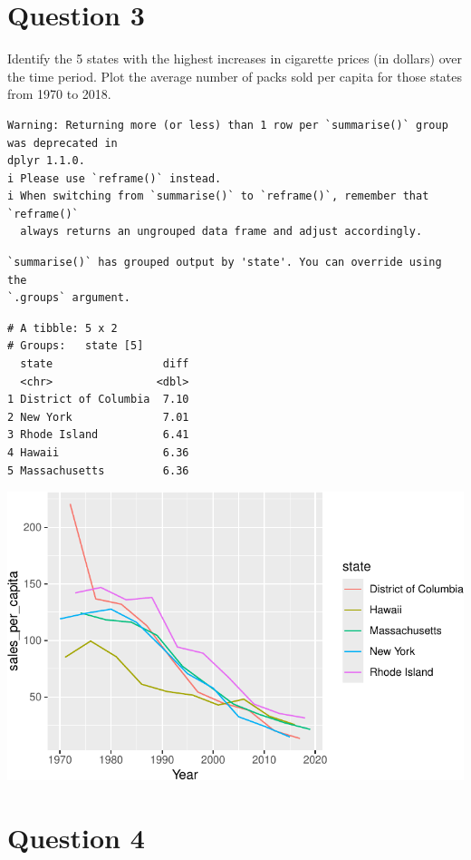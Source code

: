 \documentclass[
]{article}
\begin{document}
\section{Question 3}\label{question-3}

Identify the 5 states with the highest increases in cigarette prices (in
dollars) over the time period. Plot the average number of packs sold per
capita for those states from 1970 to 2018.

\begin{verbatim}
Warning: Returning more (or less) than 1 row per `summarise()` group was deprecated in
dplyr 1.1.0.
i Please use `reframe()` instead.
i When switching from `summarise()` to `reframe()`, remember that `reframe()`
  always returns an ungrouped data frame and adjust accordingly.
\end{verbatim}

\begin{verbatim}
`summarise()` has grouped output by 'state'. You can override using the
`.groups` argument.
\end{verbatim}

\begin{verbatim}
# A tibble: 5 x 2
# Groups:   state [5]
  state                 diff
  <chr>                <dbl>
1 District of Columbia  7.10
2 New York              7.01
3 Rhode Island          6.41
4 Hawaii                6.36
5 Massachusetts         6.36
\end{verbatim}

\includegraphics{ephraim-m-hwk3-3_files/figure-pdf/unnamed-chunk-3-1.pdf}

\section{Question 4}\label{question-4}
\end{document}
